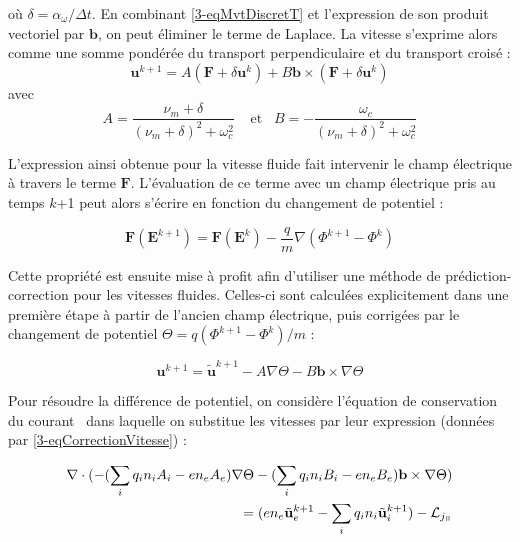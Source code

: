 \begin{refsection}
où $\delta=\alpha_\omega/\Delta t$. En combinant \ref{3-eqMvtDiscretT} et
l'expression de son produit vectoriel par $\mathbf b$, on peut éliminer le
terme de Laplace. La vitesse s'exprime alors comme une somme pondérée du
transport perpendiculaire et du transport croisé :
\begin{equation}
\label{3-eqMvtPonderee}
\mathbf{u}^{k+1}=A\left(\mathbf F + \delta\mathbf{u}^{k}\right)+ B\mathbf
b\times\left(\mathbf F + \delta\mathbf{u}^{k}\right)
\end{equation}
avec 
\begin{equation*}
\label{3-coefficientsVitesses}
A=\frac{\nu_m+\delta}{(\nu_m+\delta)^2+\omega_c^2}\;\;\;\;\text{et}\;\;\;B=-\frac{\omega_c}{(\nu_m+\delta)^2+\omega_c^2}
\end{equation*}

L'expression ainsi obtenue pour la vitesse
fluide fait intervenir le champ électrique à travers le terme $\mathbf F$.
L'évaluation de ce terme avec un champ électrique pris au temps $k$+1 peut alors
s'écrire en fonction du changement de potentiel :

\begin{equation}
\label{3-eqCorrection}
\mathbf F(\mathbf E^{k+1}) = \mathbf F(\mathbf E^{k})-\frac{q}{m}\nabla
(\Phi^{k+1}-\Phi^{k})
\end{equation}

Cette propriété est ensuite mise à profit afin d'utiliser une méthode de
prédiction-correction pour les vitesses fluides. Celles-ci sont calculées
explicitement dans une première étape à partir de l'ancien champ électrique,
puis corrigées par le changement de potentiel
$\Theta=q(\Phi^{k+1}-\Phi^k)/m$ :

\begin{equation}
\label{3-eqCorrectionVitesse}
\mathbf u^{k+1} = \tilde{\mathbf u}^{k+1}-A\nabla
\Theta-B\mathbf b\times\nabla
\Theta
\end{equation}

Pour résoudre la différence de potentiel, on considère l'équation de
conservation du courant~ dans laquelle on substitue les
vitesses par leur expression (données par \eqref{3-eqCorrectionVitesse}) :

\begin{equation}
\begin{split}
\label{3-eqCourantCoefficient}
\nabla\cdot(-(\sum_iq_in_iA_i-en_eA_e)\nabla
\Theta-(\sum_iq_in_iB_i-en_eB_e)\mathbf
b\times\nabla
\Theta)\\=(en_e\tilde{\mathbf
u}_e^{k+1}-\sum_iq_in_i\tilde{\mathbf u}_i^{k+1})-\mathcal L_{j_\para}
\end{split}
\end{equation}


\end{refsection}

